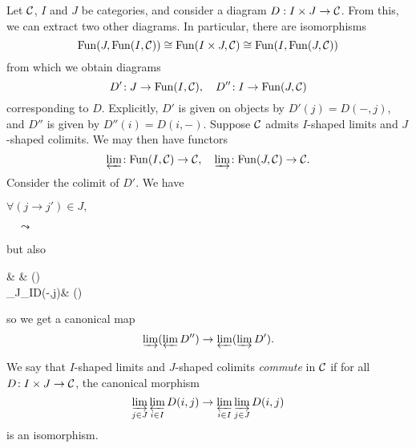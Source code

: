 \begin{construction}
	Let \(\calC\), \(I\) and \(J\) be categories, and consider a diagram \(D:I\times J \to \calC\). From this, we can extract two other diagrams. In particular, there are isomorphisms
	\[ \Fun(J,\Fun(I,\calC)) \cong \Fun(I\times J,\calC)\cong \Fun(I,\Fun(J,\calC)) \]
	from which we obtain diagrams
	\[ D'\!:J \to \Fun(I,\calC),\quad D''\!:I\to\Fun(J,\calC) \]
	corresponding to \(D\). Explicitly, \(D'\) is given on objects by \(D'(j) = D(-,j)\), and \(D''\) is given by \(D''(i) = D(i,-)\). Suppose \(\calC\) admits \(I\)-shaped limits and \(J\)-shaped colimits.
	We may then have functors
	\[ \projlim\!:\Fun(I,\calC)\to\calC,\quad\injlim\!:\Fun(J,\calC)\to\calC. \]
	Consider the colimit of \(D'\). We have
	\begin{center}\(\forall (j\to j')\in J,\quad\)
	\(\quad\leadsto\quad\)
	\end{center}
	but also
	\begin{diagram*}
		\ar[r,equal]\ar[d] & \ar[r] & \projlim() \\
		\injlim_J\projlim_I{D(-,j)}\ar[r,equal] & \injlim()\ar[ur,dashed]
	\end{diagram*}
	so we get a canonical map
	\[ \injlim(\projlim{D''})\to\projlim(\injlim{D'}). \]
\end{construction}

\begin{definition}
	We say that \(I\)-shaped limits and \(J\)-shaped colimits \emph{commute} in \(\calC\) if for all \(D\!:I\times J\to\calC\), the canonical morphism
	\[ \injlim_{j\in J}\projlim_{i\in I}{D(i,j)}\to\projlim_{i\in I}\injlim_{j\in J}{D(i,j)} \]
	is an isomorphism.
\end{definition}

